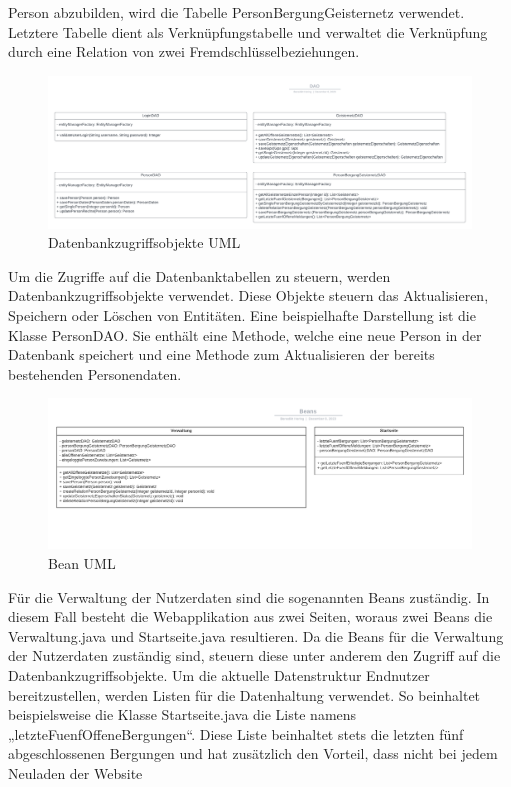 \documentclass[11pt]{article}
\begin{document}
    Person abzubilden, wird die Tabelle PersonBergungGeisternetz verwendet. Letztere Tabelle dient als Verknüpfungstabelle und verwaltet die Verknüpfung durch eine Relation von zwei Fremdschlüsselbeziehungen.
    \begin{figure}[H]
        \centering
        \includegraphics[width=\textwidth]{abbildungen/UML-DAO.png}
        \caption{Datenbankzugriffsobjekte UML}
        \label{uml-dao}
    \end{figure} 
    Um die Zugriffe auf die Datenbanktabellen zu steuern, werden Datenbankzugriffsobjekte verwendet.
    Diese Objekte steuern das Aktualisieren, Speichern oder Löschen von Entitäten.
    Eine beispielhafte Darstellung ist die Klasse PersonDAO. Sie enthält eine Methode, welche eine neue Person in der Datenbank speichert und eine Methode zum Aktualisieren der bereits bestehenden Personendaten.
    \begin{figure}[H]
        \centering
        \includegraphics[width=\textwidth]{abbildungen/UML-Bean.png}
        \caption{Bean UML}
        \label{uml-bean}
    \end{figure} 
    Für die Verwaltung der Nutzerdaten sind die sogenannten Beans zuständig. In diesem Fall besteht die Webapplikation aus zwei Seiten, woraus zwei Beans die  Verwaltung.java 
    und Startseite.java resultieren. Da die Beans für die Verwaltung der Nutzerdaten zuständig sind, steuern diese unter anderem den Zugriff auf die Datenbankzugriffsobjekte. 
    Um die aktuelle Datenstruktur Endnutzer bereitzustellen, werden Listen für die Datenhaltung verwendet. So beinhaltet beispielsweise die Klasse Startseite.java die Liste namens „letzteFuenfOffeneBergungen“. Diese Liste beinhaltet stets die letzten fünf abgeschlossenen Bergungen und hat zusätzlich den Vorteil, dass nicht bei jedem Neuladen der Website 
\end{document}

